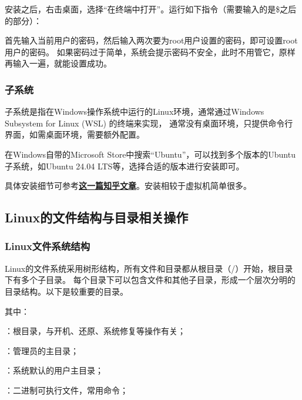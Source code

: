 安装之后，右击桌面，选择“在终端中打开”。运行如下指令（需要输入的是\$之后的部分）：

首先输入当前用户的密码，然后输入两次要为root用户设置的密码，即可设置root用户的密码。
如果密码过于简单，系统会提示密码不安全，此时不用管它，原样再输入一遍，就能设置成功。

\subsubsection{子系统}
子系统是指在Windows操作系统中运行的Linux环境，通常通过Windows Subsystem for Linux (WSL) 的终端来实现，
通常没有桌面环境，只提供命令行界面，如需桌面环境，需要额外配置。

在Windows自带的Microsoft Store中搜索“Ubuntu”，可以找到多个版本的Ubuntu子系统，如Ubuntu 24.04 LTS等，选择合适的版本进行安装即可。

具体安装细节可参考\textbf{\textcolor{blue}{\href{https://zhuanlan.zhihu.com/p/76032647}{这一篇知乎文章}}}。安装相较于虚拟机简单很多。

\subsection{Linux的文件结构与目录相关操作}

\subsubsection{Linux文件系统结构}
Linux的文件系统采用树形结构，所有文件和目录都从根目录（/）开始，根目录下有多个子目录。
每个目录下可以包含文件和其他子目录，形成一个层次分明的目录结构。以下是较重要的目录。
\begin{center}
\begin{minipage}{0.8\textwidth}
\end{minipage}
\end{center}
其中：

\code{/}：根目录，与开机、还原、系统修复等操作有关；

：管理员的主目录；

：系统默认的用户主目录；

：二进制可执行文件，常用命令；


